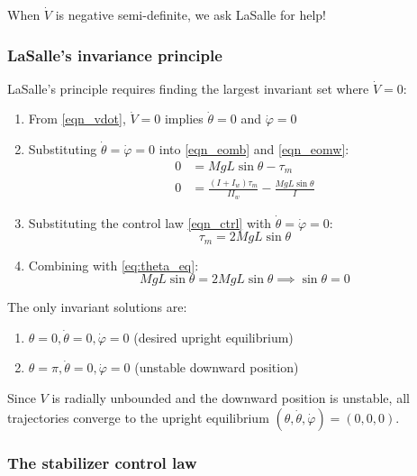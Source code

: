 \documentclass{article}
\begin{document}
When $\dot{V}$ is negative semi-definite, we ask LaSalle for help!

\subsubsection*{LaSalle's invariance principle}

LaSalle's principle requires finding the largest invariant set where $\dot{V} = 0$:

\begin{enumerate}
  \item From \eqref{eqn_vdot}, $\dot{V} = 0$ implies $\dot{\theta} = 0$ and $\dot{\varphi} = 0$

  \item Substituting $\dot{\theta} = \dot{\varphi} = 0$ into \eqref{eqn_eomb} and \eqref{eqn_eomw}:
  \begin{align}
    0 &= MgL\sin\theta - \tau_m \label{eq:theta_eq} \\
    0 &= \frac{(I + I_w)\tau_m}{I I_w} - \frac{MgL\sin\theta}{I} \label{eq:phi_eq}
  \end{align}

  \item Substituting the control law \eqref{eqn_ctrl} with $\dot{\theta} = \dot{\varphi} = 0$:
  \begin{equation}
    \tau_m = 2MgL\sin\theta
  \end{equation}

  \item Combining with \eqref{eq:theta_eq}:
  \begin{equation}
      MgL\sin\theta = 2MgL\sin\theta \implies \sin\theta = 0
  \end{equation}
\end{enumerate}

The only invariant solutions are:
\begin{enumerate}
  \item$\theta=0,\dot{\theta}=0,\dot{\varphi}=0$ (desired upright equilibrium)
  \item$\theta=\pi,\dot{\theta}=0,\dot{\varphi}=0$ (unstable downward position)
\end{enumerate}

Since $V$ is radially unbounded and the downward position is unstable, all trajectories converge to the upright equilibrium $(\theta, \dot{\theta}, \dot{\varphi}) = (0, 0, 0)$.

\subsubsection*{The stabilizer control law}
\end{document}
